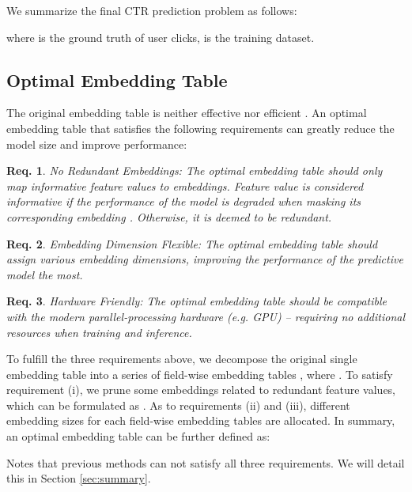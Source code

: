 \documentclass[sigconf]{acmart}
\newtheorem{myDef}{Req.}
\begin{document}
We summarize the final CTR prediction problem as follows:

where  is the ground truth of user clicks,  is the training dataset. 



\subsection{Optimal Embedding Table}
\label{sec:problem:optimal}

The original embedding table  is neither effective nor efficient \cite{AutoDim,autofield,AutoIAS,PEP}. 
An optimal embedding table that satisfies the following requirements can greatly reduce the model size and improve performance:

\begin{myDef}
\label{def:r1}
\emph{No Redundant Embeddings}: The optimal embedding table should only map informative feature values to embeddings. Feature value  is considered informative if the performance of the model is degraded when masking its corresponding embedding . Otherwise, it is deemed to be redundant. 
\end{myDef}

\begin{myDef}
\label{def:r2} \emph{Embedding Dimension Flexible}: The optimal embedding table should assign various embedding dimensions, improving the performance of the predictive model the most.
\end{myDef}

\begin{myDef}
\label{def:r3} \emph{Hardware Friendly}: The optimal embedding table should be compatible with the modern parallel-processing hardware (e.g. GPU) -- requiring no additional resources when training and inference.

\end{myDef}

To fulfill the three requirements above, we decompose the original single embedding table  into a series of field-wise embedding tables , where . To satisfy requirement (i), we prune some embeddings related to redundant feature values, which can be formulated as . As to requirements (ii) and (iii), different embedding sizes for each field-wise embedding tables are allocated. In summary, an optimal embedding table can be further defined as:


Notes that previous methods can not satisfy all three requirements. We will detail this in Section \ref{sec:summary}.
\end{document}
